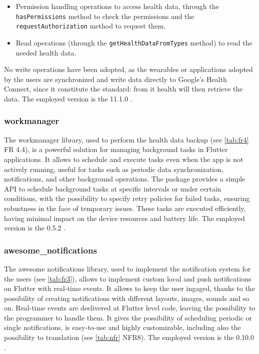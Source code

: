 \begin{itemize}[nosep] %
    \item Permission handling operations to access health data, through the \texttt{hasPermissions} method to check the permissions and the \texttt{requestAuthorization} method to request them.
    \item Read operations (through the \texttt{getHealthDataFromTypes} method) to read the needed health data.
\end{itemize}

\noindent No write operations have been adopted, as the wearables or applications adopted by the users are synchronized and write data directly to Google's Health Connect, since it constitute the standard: from it health will then retrieve the data. The employed version is the 11.1.0 \cite{Health}.

\subsubsection{workmanager}
The workmanager library, used to perform the health data backup (see \cref{tab:fr4} FR 4.4), is a powerful solution for managing background tasks in Flutter applications. It allows to schedule and execute tasks even when the app is not actively running, useful for tasks such as periodic data synchronization, notifications, and other background operations. The package provides a simple API to schedule background tasks at specific intervals or under certain conditions, with the possibility to specify retry policies for failed tasks, ensuring robustness in the face of temporary issues. These tasks are executed efficiently, having minimal impact on the device resources and battery life. The employed version is the 0.5.2 \cite{Workmanager}.
\subsubsection{awesome\_notifications}
The awesome notifications library, used to implement the notification system for the users (see \cref{tab:fr3}), allows to implement custom local and push notifications on Flutter with real-time events. It allows to keep the user ingaged, thanks to the possibility of creating notifications with different layouts, images, sounds and so on. Real-time events are deelivered at Flutter level code, leaving the possibility to the programmer to handle them. It gives the possibility of scheduling periodic or single notifications, is easy-to-use and highly customizable, including also the possibility to translation (see \cref{tab:nfr} NFR8). The employed version is the 0.10.0 \cite{AwesomeNotifications}.
